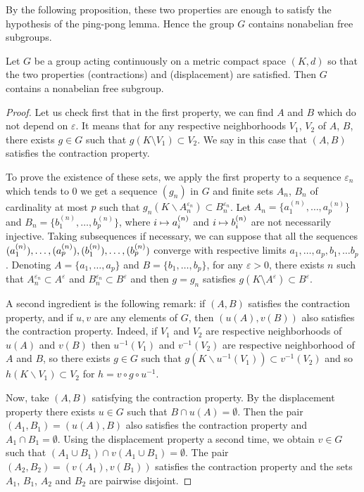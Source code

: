 \documentclass[AHL,Unicode,longabstracts,published]{cedram}
\newcommand{\ep}{\varepsilon}
\newcounter{setofcase}
\newcounter{case}[setofcase]
\let\oldmapsto\mapsto
\renewcommand*{\mapsto}{\mathchoice{\longmapsto}{\oldmapsto}{\oldmapsto}{\oldmapsto}}
\begin{document}
By the following proposition, these two properties are enough to satisfy the hypothesis of the {ping-pong lemma}. Hence the group $G$ contains nonabelian free subgroups.

\begin{prop}
Let $G$ be a group acting continuously on a metric compact space $(K,d)$ so that the two properties (contractions) and (displacement) are satisfied. Then $G$ contains a nonabelian free subgroup.
\end{prop}

\begin{proof}
Let us check first that in the first property, we can find $A$ and $B$ which do not depend on $\ep$. It means that for any respective neighborhoods $V_1$, $V_2$ of $A$, $B$, there exists $g\in G$ such that $g(K \setminus V_1)\subset V_2$. We say in this case that $(A,B)$ satisfies the contraction property.


To prove the existence of these sets, we apply the first property to a sequence $\ep_n$ which tends to $0$ we get a sequence $(g_n)$ in $G$ and finite sets $A_n$, $B_n$ of cardinality at most $p$ such that $g_n(K\backslash A_n^{\ep_n})\subset B_n^{\ep_n}$. Let $A_n=\{a_1^{(n)},\dots,a_p^{(n)}\}$ and $B_n=\{b_1^{(n)},\dots,b_p^{(n)}\}$, where $i \mapsto a_i^{(n)}$ and $i \mapsto b_i^{(n)}$ are not necessarily injective. Taking subsequences if necessary, we can suppose that all the sequences $(a_1^{(n)}),\dots,(a_p^{(n)}),\linebreak(b_1^{(n)}),\dots,(b_p^{(n)})$ converge with respective limits $a_1,\dots,a_p,b_1,\dots b_p$. Denoting $A=\{a_1,\dots,a_p\}$ and $B=\{b_1,\dots,b_p\}$, for any $\ep>0$, there exists $n$ such that $A_n^{\ep_n}\subset A^\ep$ and $B_n^{\ep_n}\subset B^\ep$ and then $g=g_n$ satisfies $g(K \setminus A^\ep)\subset B^\ep$.

A second ingredient is the following remark: if $(A,B)$ satisfies the contraction property, and if $u,v$ are any elements of $G$, then $(u(A),v(B))$ also satisfies the contraction property. Indeed, if $V_1$ and $V_2$ are respective neighborhoods of $u(A)$ and $v(B)$ then $u^{-1}(V_1)$ and $v^{-1}(V_2)$ are respective neighborhood of $A$ and $B$, so there exists $g\in G$ such that $g(K\backslash u^{-1}(V_1))\subset v^{-1}(V_2)$ and so $h(K\backslash V_1)\subset V_2$ for $h=v\circ g\circ u^{-1}$.

Now, take $(A,B)$ satisfying the contraction property. By the displacement property there exists $u\in G$ such that $B\cap u(A)=\emptyset$. Then the pair $(A_1,B_1)=(u(A),B)$ also satisfies the contraction property and $A_1\cap B_1=\emptyset$. Using the displacement property a second time, we obtain $v\in G$ such that $(A_1\cup B_1)\cap v(A_1\cup B_1)=\emptyset$. The pair $(A_2,B_2)=(v(A_1),v(B_1))$ satisfies the contraction property and the sets $A_1$, $B_1$, $A_2$ and $B_2$ are pairwise disjoint.


\end{proof}
\end{document}
